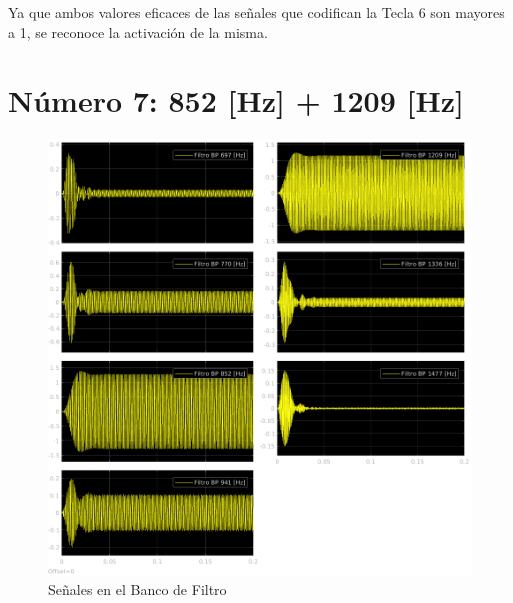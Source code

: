 Ya que ambos valores eficaces de las señales que codifican la Tecla 6 son mayores a 1, se reconoce la activación de la misma.


\section{Número 7: 852 [Hz] + 1209 [Hz]}
\label{sec:signal_7}
\begin{figure}[H]
  \centering
  \includegraphics[width=\linewidth]{images/simulacion/fallas/bank/7.png}
  \caption{Señales en el Banco de Filtro}
  \label{fig:num_7_bank}
\end{figure}

